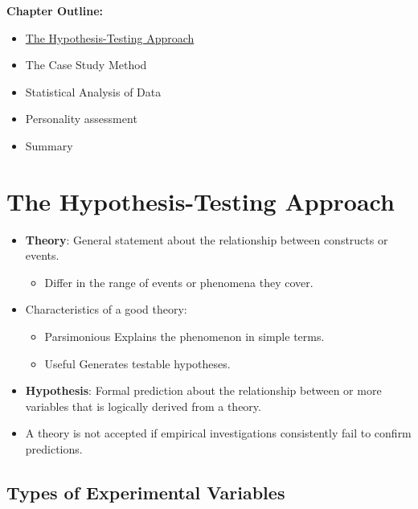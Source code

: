 \textbf{Chapter Outline:}
\begin{itemize}
    \item \hyperlink{hypothesis testing}{The Hypothesis-Testing Approach}
    \item The Case Study Method
    \item Statistical Analysis of Data
    \item Personality assessment
    \item Summary
\end{itemize}

\section{The Hypothesis-Testing Approach}\hypertarget{hypothesis testing}{}   
\begin{itemize}
    \item \textbf{Theory}: General statement about the relationship between constructs or events.
    \begin{itemize}
        \item Differ in the range of events or phenomena they cover.
    \end{itemize}
    \item Characteristics of a good theory:
    \begin{itemize}
        \item Parsimonious \textendash Explains the phenomenon in simple terms.
        \item Useful \textendash Generates testable hypotheses.
    \end{itemize}
    \item \textbf{Hypothesis}: Formal prediction about the relationship between or more variables that is logically derived from a theory.
    \item A theory is not accepted if empirical investigations consistently fail to confirm predictions.
\end{itemize}

\subsection{Types of Experimental Variables}

